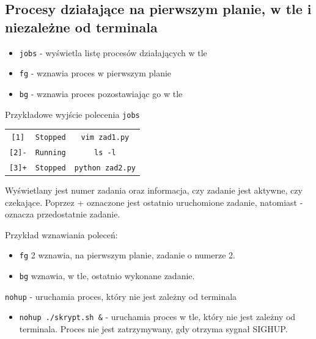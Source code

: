 \documentclass{article}
\begin{document}
\subsection{Procesy działające na pierwszym planie, w tle i niezależne od terminala}
\begin{itemize}
    \item \texttt{jobs} - wyświetla listę procesów działających w tle
    \item \texttt{fg} - wznawia proces w pierwszym planie
    \item \texttt{bg} - wznawia proces pozostawiając go w tle
\end{itemize}
Przykładowe wyjście polecenia \texttt{jobs}
\begin{table}[ht]
\centering
\begin{tabular}{c c c}
    \texttt{[1]} & \texttt{Stopped} & \texttt{vim zad1.py} \\
    \texttt{[2]-} & \texttt{Running} & \texttt{ls -l} \\
    \texttt{[3]+} & \texttt{Stopped} & \texttt{python zad2.py} \\
\end{tabular}
\end{table}

Wyświetlany jest numer zadania oraz informacja, czy zadanie jest aktywne, czy czekające. Poprzez + oznaczone jest ostatnio uruchomione zadanie, natomiast - oznacza przedostatnie zadanie.

Przykład wznawiania poleceń:
\begin{itemize}
    \item \texttt{fg} 2 wznawia, na pierwszym planie, zadanie o numerze 2. 
    \item \texttt{bg} wznawia, w tle, ostatnio wykonane zadanie.
\end{itemize}

\texttt{nohup} - uruchamia proces, który nie jest zależny od terminala
\begin{itemize}
    \item\texttt{nohup ./skrypt.sh \&} - uruchamia proces w tle, który nie jest zależny od terminala. Proces nie jest zatrzymywany, gdy otrzyma sygnał SIGHUP.
\end{itemize}
\end{document}
